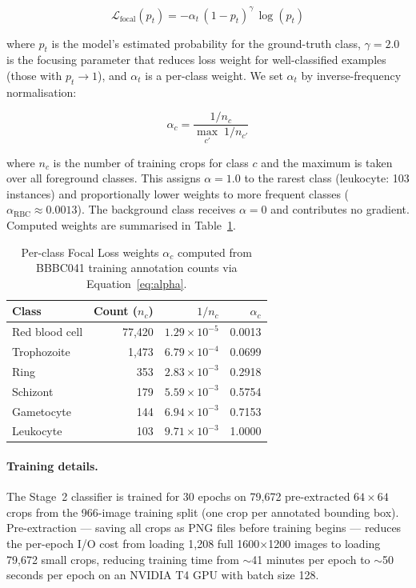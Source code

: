\documentclass[10pt,twocolumn]{article}
\begin{document}
\begin{equation}
  \mathcal{L}_{\text{focal}}(p_t) =
  -\alpha_t \,(1-p_t)^{\gamma}\,\log(p_t)
  \label{eq:focal}
\end{equation}

where $p_t$ is the model's estimated probability for the ground-truth class,
$\gamma = 2.0$ is the focusing parameter that reduces loss weight for
well-classified examples (those with $p_t \to 1$), and $\alpha_t$ is a
per-class weight. We set $\alpha_t$ by inverse-frequency normalisation:

\begin{equation}
  \alpha_c = \frac{1/n_c}{\max_{c'} \; 1/n_{c'}}
  \label{eq:alpha}
\end{equation}

where $n_c$ is the number of training crops for class $c$ and the maximum
is taken over all foreground classes. This assigns $\alpha = 1.0$ to the
rarest class (leukocyte: 103 instances) and proportionally lower weights
to more frequent classes ($\alpha_{\text{RBC}} \approx 0.0013$). The
background class receives $\alpha = 0$ and contributes no gradient.
Computed weights are summarised in Table~\ref{tab:focal_weights}.

\begin{table}[H]
\centering
\small
\caption{Per-class Focal Loss weights $\alpha_c$ computed from BBBC041
  training annotation counts via Equation~\ref{eq:alpha}.}
\label{tab:focal_weights}
\renewcommand{\arraystretch}{1.15}
\begin{tabular}{lrrr}
\toprule
\textbf{Class} & \textbf{Count} ($n_c$) & \textbf{$1/n_c$} & $\alpha_c$ \\
\midrule
Red blood cell  & 77,420 & $1.29 \times 10^{-5}$ & 0.0013 \\
Trophozoite     &  1,473 & $6.79 \times 10^{-4}$ & 0.0699 \\
Ring            &    353 & $2.83 \times 10^{-3}$ & 0.2918 \\
Schizont        &    179 & $5.59 \times 10^{-3}$ & 0.5754 \\
Gametocyte      &    144 & $6.94 \times 10^{-3}$ & 0.7153 \\
Leukocyte       &    103 & $9.71 \times 10^{-3}$ & 1.0000 \\
\bottomrule
\end{tabular}
\end{table}

\paragraph{Training details.}
The Stage~2 classifier is trained for 30 epochs on 79,672 pre-extracted
$64\times 64$ crops from the 966-image training split (one crop per
annotated bounding box). Pre-extraction --- saving all crops as PNG files
before training begins --- reduces the per-epoch I/O cost from loading
1,208 full 1600$\times$1200 images to loading 79,672 small crops,
reducing training time from $\sim$41 minutes per epoch to $\sim$50
seconds per epoch on an NVIDIA T4 GPU with batch size 128.
\end{document}
